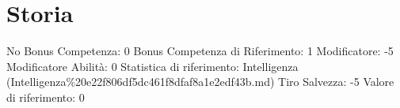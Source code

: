 \section{Storia}\label{storia}

\begin{description}
\tightlist
\item[Tags: ABI]
No Bonus Competenza: 0 Bonus Competenza di Riferimento: 1 Modificatore:
-5 Modificatore Abilità: 0 Statistica di riferimento: Intelligenza
(Intelligenza\%20e22f806df5dc461f8dfaf8a1e2edf43b.md) Tiro Salvezza: -5
Valore di riferimento: 0
\end{description}
